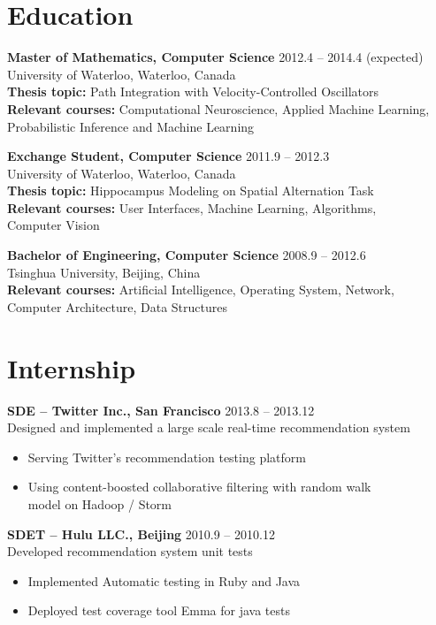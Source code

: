 \documentclass[margin]{res}
\begin{document}
\begin{resume}
\section{Education}

 {\bf Master of Mathematics, Computer Science} \hfill 2012.4 -- 2014.4 (expected)\\
 University of Waterloo, Waterloo, Canada\\
 {\bf Thesis topic:} Path Integration with Velocity-Controlled Oscillators\\
 {\bf Relevant courses:} Computational Neuroscience,  Applied Machine Learning,\\
 Probabilistic Inference and Machine Learning
 
 {\bf Exchange Student, Computer Science} \hfill 2011.9 -- 2012.3\\
 University of Waterloo, Waterloo, Canada\\
 {\bf Thesis topic:} Hippocampus Modeling on Spatial Alternation Task\\
 {\bf Relevant courses:} User Interfaces, Machine Learning, Algorithms, \\
 Computer Vision
 
 {\bf Bachelor of Engineering, Computer Science} \hfill 2008.9 -- 2012.6\\
 Tsinghua University, Beijing, China\\
 {\bf Relevant courses:} Artificial Intelligence, Operating System, Network, \\
 Computer Architecture, Data Structures

 
 
 \section{Internship}

 {\bf SDE -- Twitter Inc., San Francisco} \hfill 2013.8 -- 2013.12\\
 Designed and implemented a large scale real-time recommendation system
  \begin{itemize} \itemsep -2pt
  \item Serving Twitter's recommendation testing platform
  \item Using content-boosted collaborative filtering with random walk\\ model on Hadoop / Storm
  \end{itemize}

 {\bf SDET -- Hulu LLC., Beijing} \hfill 2010.9 -- 2010.12\\
 Developed recommendation system unit tests
  \begin{itemize} \itemsep -2pt
  \item Implemented Automatic testing in Ruby and Java
  \item Deployed test coverage tool Emma for java tests
  \end{itemize} 




\end{resume}
\end{document}
